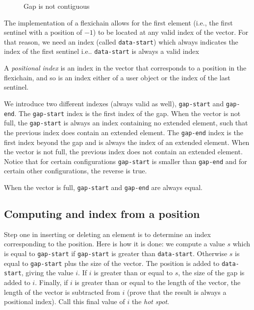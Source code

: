 \documentclass[11pt]{article}
\def\inputfig#1{}
\begin{document}
\begin{figure}
\begin{center}
\inputfig{gap3.pstex_t}
\end{center}
\caption{\label{fig-gap-not-contiguous} Gap is not contiguous}
\end{figure}

The implementation of a flexichain allows for the first element (i.e.,
the first sentinel with a position of $-1$) to be located at any valid
index of the vector.  For that reason, we need an index (called
\texttt{data-start}) which always indicates the index of the first
sentinel i.e.. \texttt{data-start} is always a valid index

A \textit{positional index} is an index in the vector that corresponds
to a position in the flexichain, and so is an index either of a user
object or the index of the last sentinel. 

We introduce two different indexes (always valid as well),
\texttt{gap-start} and \texttt{gap-end}.  The \texttt{gap-start} index
is the first index of the gap.  When the vector is not full, the
\texttt{gap-start} is always an index containing no extended element,
such that the previous index does contain an extended element. The
\texttt{gap-end} index is the first index beyond the gap and is always
the index of an extended element.  When the vector is not full, the
previous index does not contain an extended element.  Notice that for
certain configurations \texttt{gap-start} is smaller than
\texttt{gap-end} and for certain other configurations, the reverse is
true.

When the vector is full, \texttt{gap-start} and \texttt{gap-end} are
always equal.

\subsection{Computing and index from a position}

Step one in inserting or deleting an element is to determine an index
corresponding to the position.  Here is how it is done: we compute a
value $s$ which is equal to \texttt{gap-start} if \texttt{gap-start}
is greater than \texttt{data-start}.  Otherwise $s$ is equal to
\texttt{gap-start} plus the size of the vector.  The position is added
to \texttt{data-start}, giving the value $i$.  If $i$ is greater than
or equal to $s$, the size of the gap is added to $i$.  Finally, if $i$
is greater than or equal to the length of the vector, the length of
the vector is subtracted from $i$ (prove that the result is always a
positional index).  Call this final value of $i$ the \textit{hot
spot}.
\end{document}

